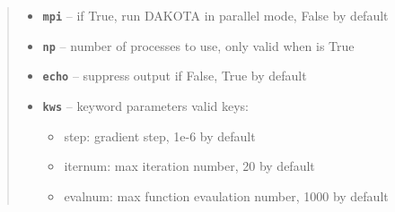 \documentclass[letterpaper,10pt,english]{sphinxmanual}
\begin{document}
\begin{fulllineitems}
\begin{fulllineitems}
\begin{quote}
\begin{description}
\begin{itemize}
\item {} 
\textbf{\texttt{mpi}} -- if True, run DAKOTA in parallel mode, False by default

\item {} 
\textbf{\texttt{np}} -- number of processes to use, only valid when  is True

\item {} 
\textbf{\texttt{echo}} -- suppress output if False, True by default

\item {} 
\textbf{\texttt{kws}} -- 
keyword parameters
valid keys:
\begin{itemize}
\item {} 
step: gradient step, 1e-6 by default

\item {} 
iternum: max iteration number, 20 by default

\item {} 
evalnum: max function evaulation number, 1000 by default

\end{itemize}


\end{itemize}

\end{description}\end{quote}

\end{fulllineitems}


\begin{fulllineitems}
\label{src/apidocs/dakopt:genopt.dakopt.DakotaOC.vcors}
\end{fulllineitems}


\end{fulllineitems}


\begin{fulllineitems}
\label{src/apidocs/dakopt:genopt.dakopt.test_dakotaoc1}
\end{fulllineitems}


\begin{fulllineitems}
\label{src/apidocs/dakopt:genopt.dakopt.test_dakotaoc2}
\end{fulllineitems}
\end{document}
